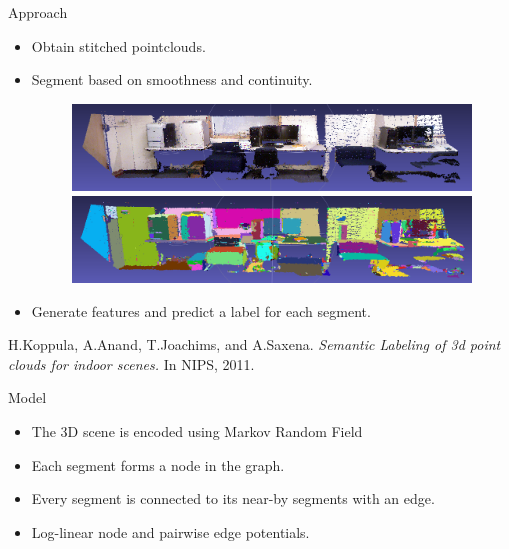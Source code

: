 \documentclass{beamer}
\begin{document}
\begin{frame}{Approach}
	\begin{itemize}
		\item Obtain stitched pointclouds.
		\item Segment based on smoothness and continuity. 
		\begin{figure}
		       \includegraphics[width=.9\linewidth]{mengo.png}\\
		       \includegraphics[width=.9\linewidth]{meng_segmented.png}
	         \end{figure}
		\item Generate features and predict a label for each segment.
	\end{itemize}
	
	\vskip 0.25in
{\scriptsize
 H.Koppula, A.Anand, T.Joachims, and A.Saxena. \emph{Semantic Labeling of 3d point clouds for indoor scenes.} In NIPS, 2011.\\
}
\end{frame}


\begin{frame}{Model}
\begin{itemize}
 \item The 3D scene is encoded using Markov Random Field  
 \item Each segment forms a node in the graph.
 \item Every segment is connected to its near-by segments with an edge.
 \item Log-linear node and pairwise edge potentials.
\end{itemize}
\end{frame}
\end{document}
